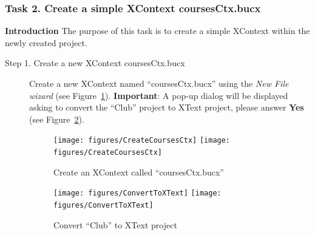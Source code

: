 \subsubsection{Task 2. Create a simple XContext coursesCtx.bucx}\label{Sec:SimpleContext}
\textbf{Introduction} The purpose of this task is to create a simple XContext within the newly created project.
\begin{description}
\item[Step 1. Create a new XContext coursesCtx.bucx] Create a new XContext named ``coursesCtx.bucx'' using the \emph{New File wizard} (see Figure~\ref{fig:CreateCoursesCtx}).
         \textbf{Important}: A pop-up dialog will be displayed asking to convert the ``Club''
         project to XText project, please answer \textbf{Yes} (see Figure~\ref{fig:ConvertToXText}).
\begin{figure}[!htbp]
  \centering
  \texttt{[image: figures/CreateCoursesCtx]}
  \else
  \texttt{[image: figures/CreateCoursesCtx]}
  \endif
  \caption{Create an XContext called ``coursesCtx.bucx''}
  \label{fig:CreateCoursesCtx}
\end{figure}
\begin{figure}[!htbp]
  \centering
  \texttt{[image: figures/ConvertToXText]}
  \else
  \texttt{[image: figures/ConvertToXText]}
  \endif
  \caption{Convert ``Club'' to XText project}
  \label{fig:ConvertToXText}
\end{figure}


\end{description}
